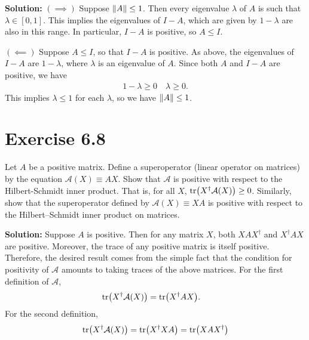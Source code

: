 \documentclass{book}
\newcommand{\mc}[1]{\mathcal{#1}}
\begin{document}
    \textbf{Solution:} $(\implies)$ Suppose $\norm{A}\leq 1$. Then every eigenvalue $\lambda$ of $A$ is such that $\lambda \in [0,1]$. This implies the eigenvalues of $I-A$, which are given by $1-\lambda$ are also in this range. In particular, $I-A$ is positive, so $A\leq I$.
    
    $(\impliedby)$ Suppose $A\leq I$, so that $I-A$ is positive. As above, the eigenvalues of $I-A$ are $1-\lambda$, where $\lambda$ is an eigenvalue of $A$. Since both $A$ and $I-A$ are positive, we have
    \begin{align}
        1-\lambda \geq 0 \quad \lambda \geq 0.
    \end{align}
    This implies $\lambda \leq 1$ for each $\lambda$, so we have $\norm{A}\leq 1$.

\section*{Exercise 6.8}
    Let $A$ be a positive matrix. Define a superoperator (linear operator on matrices) by the equation $\mc{A}(X) \equiv A X$. Show that $\mc{A}$ is positive with respect to the Hilbert-Schmidt inner product. That is, for all $X$, $\tr(X^\dagger \mc{A}(X)) \geq 0$. Similarly, show that the superoperator defined by $\mc{A} (X) \equiv XA$ is positive with respect to the Hilbert–Schmidt inner product on matrices.
    
    \textbf{Solution:} Suppose $A$ is positive. Then for any matrix $X$, both $XAX^\dagger$ and $X^\dagger A X$ are positive. Moreover, the trace of any positive matrix is itself positive. Therefore, the desired result comes from the simple fact that the condition for positivity of $\mc{A}$ amounts to taking traces of the above matrices. For the first definition of $\mc{A}$,
    \begin{align}
        \tr(X^\dagger \mc{A}(X)) &= \tr(X^\dagger AX).
    \end{align}
    For the second definition,
    \begin{align}
        \tr(X^\dagger \mc{A}(X)) = \tr(X^\dagger X A) = \tr(XAX^\dagger)
    \end{align}
\end{document}
